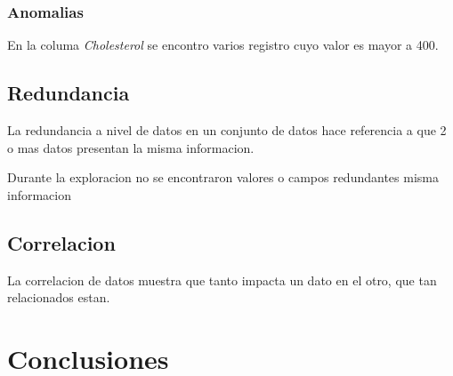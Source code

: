 \documentclass[12pt, letterpaper]{article}
\begin{document}
\subsubsection{Anomalias}
En la columa \textit{Cholesterol} se encontro varios registro cuyo valor es mayor a 400.


\subsection{Redundancia}
La redundancia a nivel de datos en un conjunto de datos hace referencia a que 2 o mas datos
presentan la misma informacion.

Durante la exploracion no se encontraron valores o campos redundantes
misma informacion
\subsection{Correlacion}
La correlacion de datos muestra que tanto impacta un dato en el otro, que tan relacionados estan.

\section{Conclusiones}

\printbibliography
\end{document}
